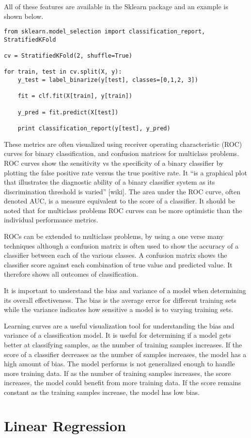 All of these features are available in the Sklearn package and an example is shown below.
%
\begin{lstlisting}
from sklearn.model_selection import classification_report, StratifiedKFold

cv = StratifiedKFold(2, shuffle=True)

for train, test in cv.split(X, y):
    y_test = label_binarize(y[test], classes=[0,1,2, 3])

    fit = clf.fit(X[train], y[train])

    y_pred = fit.predict(X[test])

    print classification_report(y[test], y_pred)
\end{lstlisting}
%
These metrics are often visualized using receiver operating characteristic (ROC) curves for binary classification, and confusion matrices for multiclass problems.  ROC curves show the sensitivity vs the specificity of a binary classifier by plotting the false positive rate versus the true positive rate.  It “is a graphical plot that illustrates the diagnostic ability of a binary classifier system as its discrimination threshold is varied” [wiki]. The area under the ROC curve, often denoted AUC, is a measure equivalent to the score of a classifier. It should be noted that for multiclass problems ROC curves can be more optimistic than the individual performance metrics.

ROCs can be extended to multiclass problems, by using a one verse many techniques although a confusion matrix is often used to show the accuracy of a classifier between each of the various classes.  A confusion matrix shows the classifier score against each combination of true value and predicted value.  It therefore shows all outcomes of classification.

It is important to understand the bias and variance of a model when determining its overall effectiveness.  The bias is the average error for different training sets while the variance indicates how sensitive a model is to varying training sets.

Learning curves are a useful visualization tool for understanding the bias and variance of a classification model.  It is useful for determining if a model gets better at classifying samples, as the number of training samples increases.  If the score of a classifier decreases as the number of samples increases, the model has a high amount of bias.  The model performs is not generalized enough to handle more training data.  If as the number of training samples increases, the score increases, the model could benefit from more training data.  If the score remains constant as the training samples increase, the model has low bias.

\section{Linear Regression}
